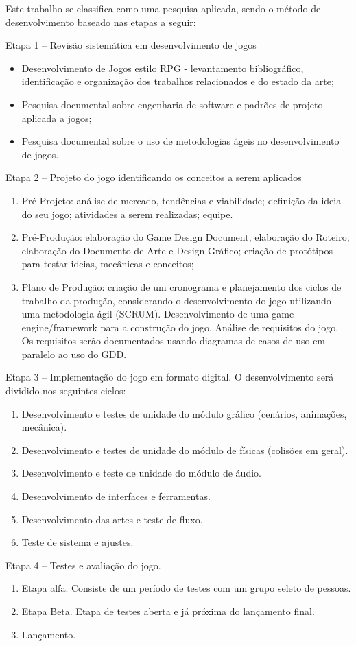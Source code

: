 \documentclass[12pt, 
openright, 
oneside, 
a4paper,    
brazil]{facom-ufu-abntex2}
\begin{document}
Este trabalho se classifica como uma pesquisa aplicada, sendo o método de desenvolvimento baseado nas etapas a seguir:

Etapa 1 – Revisão sistemática em desenvolvimento de jogos
\begin{itemize}
\item Desenvolvimento de Jogos estilo RPG - levantamento bibliográfico, identificação e organização dos trabalhos relacionados e do estado da arte;
\item Pesquisa documental sobre engenharia de software e padrões de projeto aplicada a jogos;
\item Pesquisa documental sobre o uso de metodologias ágeis no desenvolvimento de jogos.
\end{itemize}

Etapa 2 – Projeto do jogo identificando os conceitos a serem aplicados 
\begin{enumerate}
\item Pré-Projeto: análise de mercado, tendências e viabilidade;
definição da ideia do seu jogo; atividades a serem realizadas;
equipe.
\item Pré-Produção: elaboração do Game Design Document, elaboração do Roteiro, elaboração do Documento de Arte e Design Gráfico; criação de protótipos para testar ideias, mecânicas e conceitos;
\item Plano de Produção: criação de um cronograma e planejamento dos ciclos de trabalho da produção, considerando o desenvolvimento do jogo utilizando uma  metodologia ágil (SCRUM). Desenvolvimento de uma game engine/framework para a construção do jogo. Análise de requisitos do jogo. Os requisitos serão documentados usando diagramas de casos de uso em paralelo ao uso do GDD.
\end{enumerate}

Etapa 3 – Implementação do jogo em formato digital. O desenvolvimento será dividido nos seguintes ciclos:
\begin{enumerate}
\item Desenvolvimento e testes de unidade do módulo gráfico
(cenários, animações, mecânica).
\item Desenvolvimento e testes de unidade do módulo de físicas
(colisões em geral).
\item Desenvolvimento e teste de unidade do módulo de áudio.
\item Desenvolvimento de interfaces e ferramentas.
\item Desenvolvimento das artes e teste de fluxo.
\item Teste de sistema e ajustes.
\end{enumerate}
Etapa 4 – Testes e avaliação do jogo.
\begin{enumerate}
\item Etapa alfa. Consiste de um período de testes com um grupo seleto de pessoas.
\item Etapa Beta. Etapa de testes aberta e já próxima do lançamento final.
\item Lançamento.
\end{enumerate}
\end{document}
